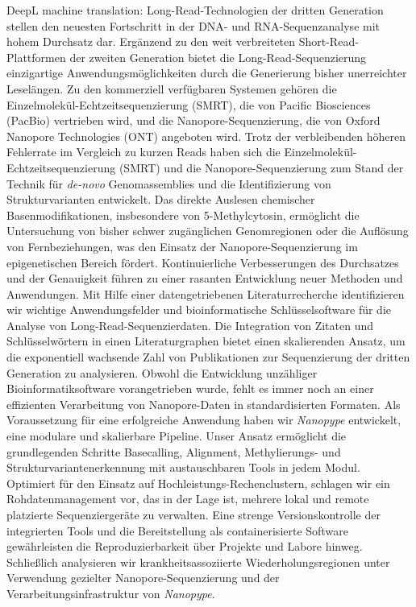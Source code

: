 DeepL machine translation:
Long-Read-Technologien der dritten Generation stellen den neuesten Fortschritt in der DNA- und RNA-Sequenzanalyse mit hohem Durchsatz dar.
Ergänzend zu den weit verbreiteten Short-Read-Plattformen der zweiten Generation bietet die Long-Read-Sequenzierung einzigartige Anwendungsmöglichkeiten durch die Generierung bisher unerreichter Leselängen.
Zu den kommerziell verfügbaren Systemen gehören die Einzelmolekül-Echtzeitsequenzierung (SMRT), die von Pacific Biosciences (PacBio) vertrieben wird, und die Nanopore-Sequenzierung, die von Oxford Nanopore Technologies (ONT) angeboten wird.
Trotz der verbleibenden höheren Fehlerrate im Vergleich zu kurzen Reads haben sich die Einzelmolekül-Echtzeitsequenzierung (SMRT) und die Nanopore-Sequenzierung zum Stand der Technik für \textit{de-novo} Genomassemblies und die Identifizierung von Strukturvarianten entwickelt.
Das direkte Auslesen chemischer Basenmodifikationen, insbesondere von 5-Methylcytosin, ermöglicht die Untersuchung von bisher schwer zugänglichen Genomregionen oder die Auflösung von Fernbeziehungen, was den Einsatz der Nanopore-Sequenzierung im epigenetischen Bereich fördert.
Kontinuierliche Verbesserungen des Durchsatzes und der Genauigkeit führen zu einer rasanten Entwicklung neuer Methoden und Anwendungen.
Mit Hilfe einer datengetriebenen Literaturrecherche identifizieren wir wichtige Anwendungsfelder und bioinformatische Schlüsselsoftware für die Analyse von Long-Read-Sequenzierdaten.
Die Integration von Zitaten und Schlüsselwörtern in einen Literaturgraphen bietet einen skalierenden Ansatz, um die exponentiell wachsende Zahl von Publikationen zur Sequenzierung der dritten Generation zu analysieren.
Obwohl die Entwicklung unzähliger Bioinformatiksoftware vorangetrieben wurde, fehlt es immer noch an einer effizienten Verarbeitung von Nanopore-Daten in standardisierten Formaten.
Als Voraussetzung für eine erfolgreiche Anwendung haben wir \textit{Nanopype} entwickelt, eine modulare und skalierbare Pipeline. 
Unser Ansatz ermöglicht die grundlegenden Schritte Basecalling, Alignment, Methylierungs- und Strukturvariantenerkennung mit austauschbaren Tools in jedem Modul.
Optimiert für den Einsatz auf Hochleistungs-Rechenclustern, schlagen wir ein Rohdatenmanagement vor, das in der Lage ist, mehrere lokal und remote platzierte Sequenziergeräte zu verwalten.
Eine strenge Versionskontrolle der integrierten Tools und die Bereitstellung als containerisierte Software gewährleisten die Reproduzierbarkeit über Projekte und Labore hinweg.
Schließlich analysieren wir krankheitsassoziierte Wiederholungsregionen unter Verwendung gezielter Nanopore-Sequenzierung und der Verarbeitungsinfrastruktur von \textit{Nanopype}.
